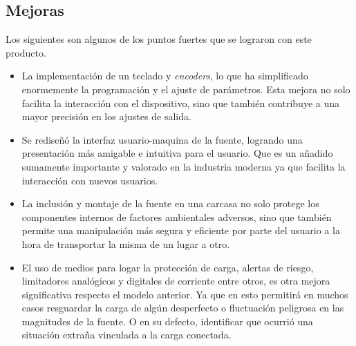 \subsection{Mejoras} 
Los siguientes son algunos de los puntos fuertes que se lograron con este producto.  
\begin{itemize}
    \item La implementación de un teclado y \textit{encoders}, lo que ha simplificado enormemente la programación y el ajuste de parámetros. Esta mejora no solo facilita la interacción con el dispositivo, sino que también contribuye a una mayor precisión en los ajustes de salida. \par
    \item Se rediseñó la interfaz usuario-maquina de la fuente, logrando una presentación más amigable e intuitiva para el usuario. Que es un añadido sumamente importante y valorado en la industria moderna ya que facilita la interacción con nuevos usuarios. \par 
    \item La inclusión y montaje de la fuente en una carcasa no solo protege los componentes internos de factores ambientales adversos, sino que también permite una manipulación más segura y eficiente por parte del usuario a la hora de transportar la misma de un lugar a otro.\par
    \item El uso de medios para logar la protección de carga, alertas de riesgo, limitadores analógicos y digitales de corriente entre otros, es otra mejora significativa respecto el modelo anterior. Ya que en esto permitirá en muchos casos resguardar la carga de algún desperfecto o fluctuación peligrosa en las magnitudes de la fuente. O en su defecto, identificar que ocurrió una situación extraña vinculada a la carga conectada.   
\end{itemize}

